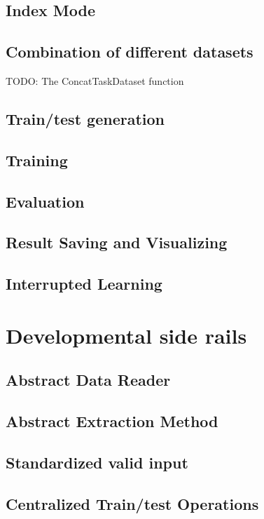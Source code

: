 \subsection{Index Mode}

\subsection{Combination of different datasets}
TODO: The ConcatTaskDataset function

\subsection{Train/test generation}

\subsection{Training}

\subsection{Evaluation}

\subsection{Result Saving and Visualizing}

\subsection{Interrupted Learning}

\section{Developmental side rails}

\subsection{Abstract Data Reader}

\subsection{Abstract Extraction Method}

\subsection{Standardized valid input}

\subsection{Centralized Train/test Operations}
